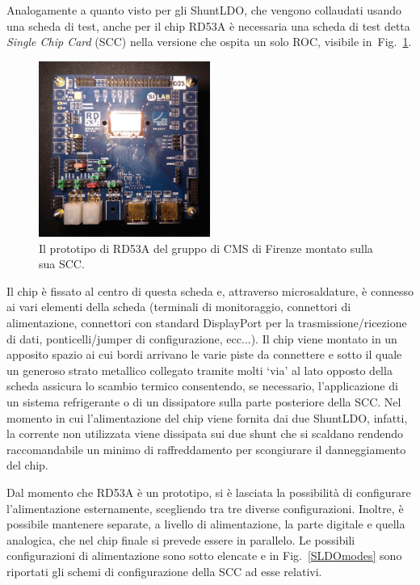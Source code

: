Analogamente a quanto visto per gli ShuntLDO, che vengono collaudati usando una scheda di test, anche per il chip RD53A è necessaria una scheda di test detta \textit{Single Chip Card} (SCC) nella versione che ospita un solo ROC, visibile in~Fig.~\ref{fig:RD53onSCC}.
\begin{figure}[t]
\centering
\includegraphics[width=0.5\textwidth]{Immagini/RD53onSCC.jpg}
\caption{Il prototipo di RD53A del gruppo di CMS di Firenze montato sulla sua SCC.}
\label{fig:RD53onSCC}
\end{figure}
 Il chip è fissato al centro di questa scheda e, attraverso microsaldature, è connesso ai vari elementi della scheda (terminali di monitoraggio, connettori di alimentazione, connettori con standard DisplayPort per la trasmissione/ricezione di dati, ponticelli/jumper di configurazione, ecc...). 
Il chip viene montato in un apposito spazio ai cui bordi arrivano le varie piste da connettere e sotto il quale un generoso strato metallico collegato tramite molti `via' al lato opposto della scheda assicura lo scambio termico consentendo, se necessario, l'applicazione di un sistema refrigerante o di un dissipatore sulla parte posteriore della SCC. 
Nel momento in cui l'alimentazione del chip viene fornita dai due ShuntLDO, infatti, la corrente non utilizzata viene dissipata sui due shunt che si scaldano rendendo raccomandabile un minimo di raffreddamento per scongiurare il danneggiamento del chip.

Dal momento che RD53A è un prototipo, si è lasciata la possibilità di configurare l'alimentazione esternamente, scegliendo tra tre diverse configurazioni.
Inoltre, è possibile mantenere separate, a livello di alimentazione, la parte digitale e quella analogica, che nel chip finale si prevede essere in parallelo. Le possibili configurazioni di alimentazione sono sotto elencate e in Fig.~\ref{SLDOmodes} sono riportati gli schemi di configurazione della SCC ad esse relativi.

